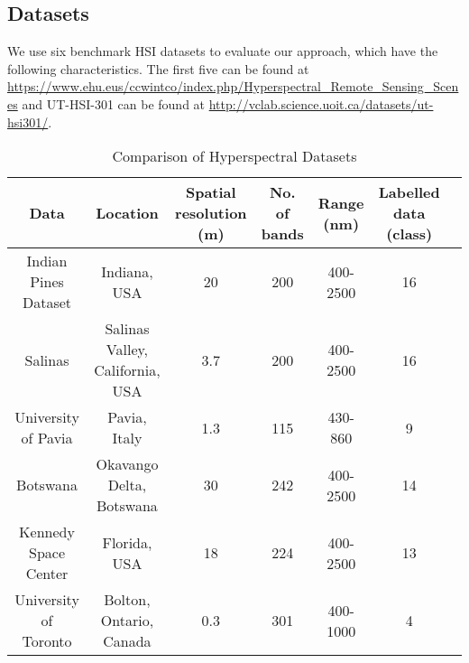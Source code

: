 \subsection{Datasets} \label{sec:datasets}

We use six benchmark HSI datasets to evaluate our approach, which have the following characteristics. The first five can be found at \url{https://www.ehu.eus/ccwintco/index.php/Hyperspectral_Remote_Sensing_Scenes} and UT-HSI-301 can be found at \url{http://vclab.science.uoit.ca/datasets/ut-hsi301/}.

\begin{table*}[h!]
\centering
\caption{Comparison of Hyperspectral Datasets}
\begin{tabular}{|c|c|c|c|c|c|c|}
\hline
\textbf{Data} & \textbf{Location} & \textbf{Spatial resolution (m)} & \textbf{No. of bands} & \textbf{Range (nm)} & \textbf{Labelled data (class)} \\
\hline
Indian Pines Dataset & Indiana, USA & 20 & 200 & 400-2500 & 16  \\
\hline
Salinas & Salinas Valley, California, USA & 3.7 & 200 & 400-2500 & 16  \\
\hline
University of Pavia & Pavia, Italy & 1.3 & 115 & 430-860 & 9  \\
\hline
Botswana & Okavango Delta, Botswana & 30 & 242 & 400-2500 & 14  \\
\hline
Kennedy Space Center & Florida, USA & 18 & 224 & 400-2500 & 13  \\
\hline
University of Toronto & Bolton, Ontario, Canada & 0.3 & 301 & 400-1000 & 4 \\
\hline
\end{tabular}
\label{tab:hyperspectral-comparison}
\end{table*}

    
    
